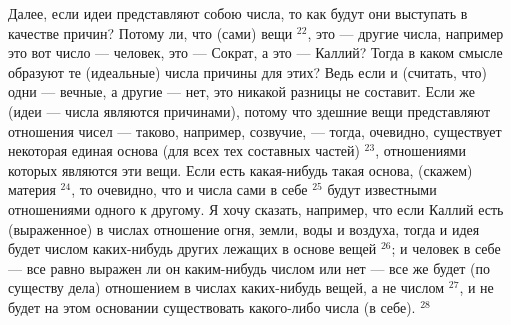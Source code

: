 \documentclass[oneside, 17pt, dvipsnames]{extbook}
\begin{document}
Далее, если идеи представляют собою числа, то как будут они выступать в качестве причин? Потому ли, что (сами) вещи $^{22}$, это — другие числа, например это вот число — человек, это — Сократ, а это — Каллий? Тогда в каком смысле образуют те (идеальные) числа причины для этих? Ведь если и (считать, что) одни — вечные, а другие — нет, это никакой разницы не составит. Если же (идеи — числа являются причинами), потому что здешние вещи представляют отношения чисел — таково, например, созвучие, — тогда, очевидно, существует некоторая единая основа (для всех тех составных частей) $^{23}$, отношениями которых являются эти вещи. Если есть какая-нибудь такая основа, (скажем) материя $^{24}$, то очевидно, что и числа сами в себе $^{25}$ будут известными отношениями одного к другому. Я хочу сказать, например, что если Каллий есть (выраженное) в числах отношение огня, земли, воды и воздуха, тогда и идея будет числом каких-нибудь других лежащих в основе вещей $^{26}$; и человек в себе — все равно выражен ли он каким-нибудь числом или нет — все же будет (по существу дела) отношением в числах каких-нибудь вещей, а не числом $^{27}$, и не будет на этом основании существовать какого-либо числа (в себе). $^{28}$
\end{document}
